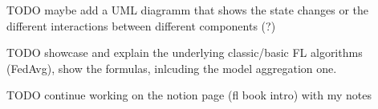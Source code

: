 TODO maybe add a UML diagramm that shows the state changes
or the different interactions between different components (?)

TODO showcase and explain the underlying classic/basic FL algorithms
(FedAvg), show the formulas, inlcuding the model aggregation one.

TODO continue working on  the notion page (fl book intro) with my notes
